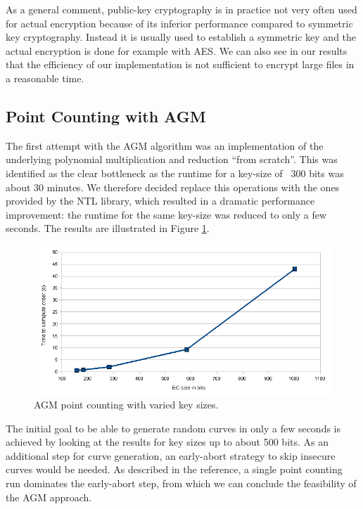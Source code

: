 \documentclass[11pt,english]{article}
\begin{document}
As a general comment, public-key cryptography is in practice not very often used for actual encryption because of its inferior performance compared to symmetric key cryptography. Instead it is usually used to establish a symmetric key and the actual encryption is done for example with AES. We can also see in our results that the efficiency of our implementation is not sufficient to encrypt large files in a reasonable time.

\subsection{Point Counting with AGM}
The first attempt with the AGM algorithm was an implementation of the underlying polynomial multiplication and reduction ``from scratch''. This was identified as the clear bottleneck as the runtime for a key-size of ~300 bits was about 30 minutes. We therefore decided replace this operations with the ones provided by the NTL library, which resulted in a dramatic performance improvement: the runtime for the same key-size was reduced to only a few seconds. The results are illustrated in Figure \ref{figure:agm}.

\label{agmres}
\begin{figure}[h]
\centering
\includegraphics[scale=0.6]{dia1.png}
\caption{AGM point counting with varied key sizes.}
\label{figure:agm}
\end{figure}

The initial goal to be able to generate random curves in only a few seconds is achieved by looking at the results for key sizes up to about 500 bits. As an additional step for curve generation, an early-abort strategy to skip insecure curves \cite{satohfgh} would be needed. As described in the reference, a single point counting run dominates the early-abort step, from which we can conclude the feasibility of the AGM approach.
\end{document}
